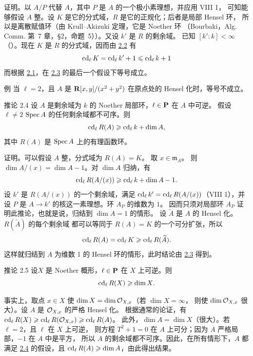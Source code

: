 证明。以 $A/P$ 代替 $A$，其中 $P$ 是 $A$ 的一个极小素理想，并应用 VIII 1，%
可知能够假设 $A$ 整。设 $K$ 是它的分式域，$R$ 是它的正规化；后者是局部 Hensel 环，
所以是离散赋值环（由 Krull--Akizuki 定理，它是 Noether 环
（Bourbaki，Alg. Comm. 第~7 章，\S 2，命题~5））。又设 $k'$ 是 $R$ 的剩余域。
已知 $[k':k]<\infty$（\loccit）。现在 $K$ 是 $R$ 的分式域，因而由\pageoriginale
\hyperref[X.thm2.2]{2.2} 有
$$
\operatorname{cd}_{\ell}K=\operatorname{cd}_{\ell}k'+1\leqslant \operatorname{cd}_{\ell}k+1
$$
而根据 \hyperref[X.thm2.1]{2.1}，在 \hyperref[X.thm2.3]{2.3} 的最后一个假设下等号成立。

\begin{enonce*}[remark]{例}
当 $\ell=2$，且 $A$ 是 $\mathbf{R}[x,y]/(x^2+y^2)$ 在原点处的 Hensel 化时，等号不成立。
\end{enonce*}

\begin{enonce*}{推论 2.4}
设 $A$ 是剩余域为 $k$ 的 Noether 局部环，$\ell\in \mathbf{P}$ 在 $A$ 中可逆。
假设 $\ell\neq 2$  $\operatorname{Spec} A$ 的任何剩余域都不可序。则
$$
\operatorname{cd}_{\ell}R(A)\geqslant \operatorname{cd}_{\ell}k+\dim A{},
$$
其中 $R(A)$ 是 $\operatorname{Spec} A$ 上的有理函数环。
\end{enonce*}

证明。可以假设 $A$ 整，分式域为 $R(A)=K$。
取 $x\in 𝔪_A$。
则 $\dim A/(x)=\dim A-1$。对 $\dim A$ 归纳，有
$$
\operatorname{cd}_{\ell}R(A/(x))\geqslant \operatorname{cd}_{\ell}k+\dim A-1{}.
$$
设 $k'$ 是 $R(A/(x))$ 的一个剩余域，满足
$\operatorname{cd}_{\ell}k'=\operatorname{cd}_{\ell}R(A/(x))$（\cf VIII 1），并设 $P$ %
是 $A\rightarrow k'$ 的核这一素理想。环 $A_P$ 的维数为 $1$。
因而只须对局部环 $A_P$ 证明此推论，也就是说，归结到 $\dim A=1$ 的情形。
设 $\widetilde{A}$ 是 $A$ 的 Hensel 化。$R(\widetilde{A})$ 的每个剩余域
都可以等同于 $R(A)=K$ 的一个可分扩张，所以
$$
\operatorname{cd}_{\ell}R(A)=\operatorname{cd}_{\ell}K\geqslant \operatorname{cd}_{\ell}R(\widetilde{A}){}.
$$
这样就归结到 $A$ 为维数 1 的 Hensel 环的情形，此时结论由 \hyperref[X.thm2.3]{2.3} 得到。

\begin{enonce*}{推论 2.5}
设\pageoriginale $X$ 是 Noether 概形，$\ell\in \mathbf{P}$ 在 $X$ 上可逆。则
$$
\operatorname{cd}_{\ell}R(X)\geqslant \dim X{}.
$$
\end{enonce*}

事实上，取点 $x\in X$ 使 $\dim X=\dim {\mathcal O}_{X,x}$（若 $\dim X=\infty$，
则使 $\dim {\mathcal O}_{X,x}$ 很大）。设 $A$ 是 ${\mathcal O}_{X,x}$ 的严格 Hensel 化。
根据通常的论证，有 $\operatorname{cd}_{\ell}R(X)\geqslant \operatorname{cd}_{\ell}R({\mathcal O}_{X,x})\geqslant \operatorname{cd}_{\ell}R(A)$。
此外，$\dim A=\dim X$（\resp 很大）。若 $\ell=2$，且 $\ell$ 在 $X$ 上可逆，
则方程 $T^2+1=0$ 在 $A$ 上可分；因为 $A$ 严格局部，$-1$ 在 $A$ 中是平方，
所以 $A$ 的剩余域都不可序。因此，在所有情形下，$A$ 都满足
\hyperref[X.cor2.4]{2.4} 的假设，且 $\operatorname{cd}_{\ell}R(A)\geqslant \dim A$，由此得出结果。


